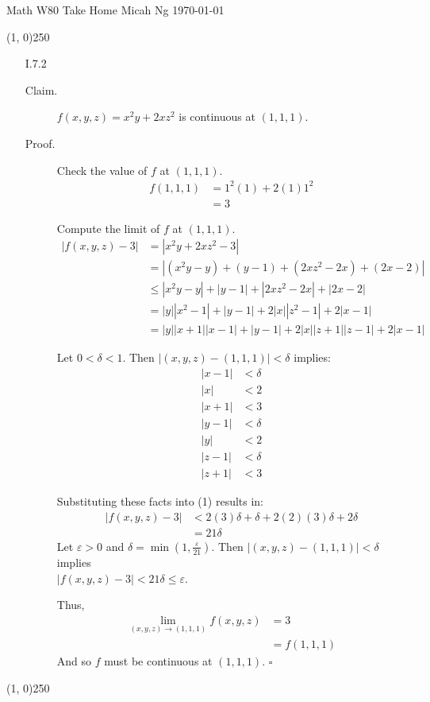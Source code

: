 \documentclass[11pt,letterpaper]{article}
\begin{document}
\noindent
Math W80 Take Home \hfill Micah Ng \hfill \today

\begin{center}
\line(1, 0){250}
\end{center}

\begin{enumerate}
\item[I.7.2]
  \begin{description}
  \item[Claim.]
    $f(x,y,z)=x^2y+2xz^2$ is continuous at $(1,1,1)$.

  \item[Proof.]
    Check the value of $f$ at $(1,1,1)$.
    \begin{align*}
      f(1,1,1) &= 1^2(1)+2(1)1^2 \\
          &= 3
    \end{align*}

    Compute the limit of $f$ at $(1,1,1)$.
    \begin{align*}
      |f(x,y,z)-3| &= \left|x^2y+2xz^2-3\right| \\
          &= \left|\left(x^2y-y\right)+(y-1)+\left(2xz^2-2x\right)+(2x-2)\right| \\
          &\leq \left|x^2y-y\right|+|y-1|+\left|2xz^2-2x\right|+|2x-2| \\
          &= |y|\left|x^2-1\right|+|y-1|+2|x|\left|z^2-1\right|+2|x-1| \\
          &= |y||x+1||x-1|+|y-1|+2|x||z+1||z-1|+2|x-1| \tag{1}
    \end{align*}

    Let $0<\delta<1$. Then $|(x,y,z)-(1,1,1)|<\delta$ implies:
    \begin{align*}
      |x-1| &< \delta \\
      |x| &< 2 \\
      |x+1| &< 3 \\
      |y-1| &< \delta \\
      |y| &< 2 \\
      |z-1| &< \delta \\
      |z+1| &< 3
    \end{align*}

    Substituting these facts into (1) results in:
    \begin{align*}
      |f(x,y,z)-3| &< 2(3)\delta+\delta+2(2)(3)\delta+2\delta \\
          &= 21\delta
    \end{align*}
    Let $\varepsilon>0$ and $\delta=\min\left(1,\frac{\varepsilon}{21}\right)$.
    Then $|(x,y,z)-(1,1,1)|<\delta$ implies \\
    $|f(x,y,z)-3|<21\delta\leq\varepsilon$.

    Thus,
    \begin{align*}
      \lim\limits_{(x,y,z)\to(1,1,1)}f(x,y,z) &= 3 \\
          &= f(1,1,1)
    \end{align*}
    And so $f$ must be continuous at $(1,1,1)$. \hfill$\square$
  \end{description}
\end{enumerate}

\begin{center}
\line(1, 0){250}
\end{center}
\end{document}
